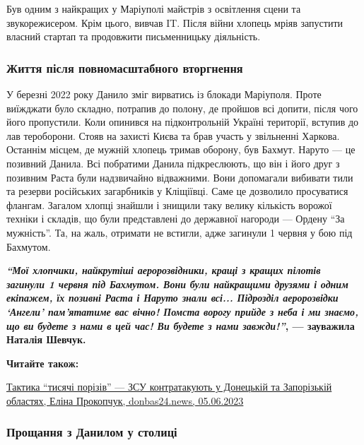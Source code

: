 Був одним з найкращих у Маріуполі майстрів з освітлення сцени та звукорежисером. Крім цього, вивчав IT. Після війни хлопець мріяв запустити власний стартап та продовжити письменницьку діяльність.

\subsubsection{Життя після повномасштабного вторгнення}

У березні 2022 року Данило зміг вирватись із блокади Маріуполя. Проте виїжджати
було складно, потрапив до полону, де пройшов всі допити, після чого його
пропустили. Коли опинився на підконтрольній Україні території, вступив до лав
тероборони. Стояв на захисті Києва та брав участь у звільненні Харкова.
Останнім місцем, де мужній хлопець тримав оборону, був Бахмут. Наруто — це
позивний Данила. Всі побратими Данила підкреслюють, що він і його друг з
позивним Раста були надзвичайно відважними. Вони допомагали вибивати тили та
резерви російських загарбників у Кліщіївці. Саме це дозволило просуватися
флангам. Загалом хлопці знайшли і знищили таку велику кількість ворожої техніки
і складів, що були представлені до державної нагороди — Ордену \enquote{За мужність}.
Та, на жаль, отримати не встигли, адже загинули 1 червня у бою під Бахмутом. 

\begin{leftbar}
	\begingroup
		\bfseries
{\color{blue}\em\enquote{Мої хлопчики, найкрутіші аеророзвідники, кращі з кращих пілотів загинули
1 червня під Бахмутом. Вони були найкращими друзями і одним екіпажем,
їх позивні Раста і Наруто знали всі... Підрозділ аеророзвідки \enquote{Ангели}
пам'ятатиме вас вічно! Помста ворогу прийде з неба і ми знаємо, що ви
будете з нами в цей час! Ви будете з нами завжди!}}, — зауважила Наталія
Шевчук. 
	\endgroup
\end{leftbar}

\textbf{Читайте також:} 

\href{https://donbas24.news/news/taktika-tisyaci-poriziv-zsu-kontratakuyut-u-doneckii-ta-zaporizkii-oblastyax}{%
Тактика \enquote{тисячі порізів} — ЗСУ контратакують у Донецькій та Запорізькій областях, Еліна Прокопчук, donbas24.news, 05.06.2023}


\subsubsection{Прощання з Данилом у столиці}

